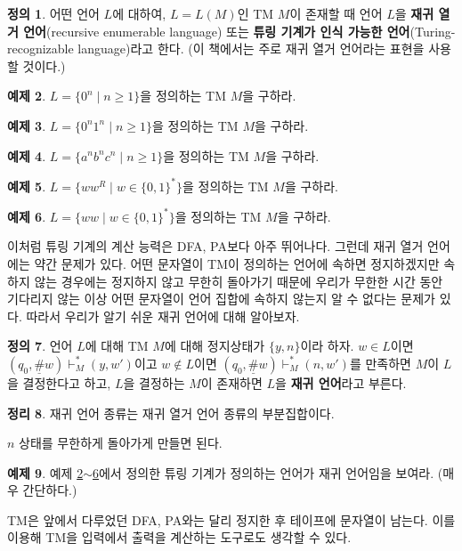\documentclass[b5paper, 11pt]{book}
\theoremstyle{definition}
\newtheorem{defn}{정의}[chapter]
\newtheorem{thm}[defn]{정리}
\newtheorem{ex}[defn]{예제}
\newenvironment{pf*}{\pushQED{\qed}\pf}
{\popQED\endpf}
\begin{document}
\begin{defn}
    어떤 언어 $L$에 대하여, $L = L(M)$인 TM $M$이 존재할 때 언어 $L$을 \textbf{재귀 열거 언어}(recursive enumerable language) 또는 \textbf{튜링 기계가 인식 가능한 언어}(Turing-recognizable language)라고 한다. (이 책에서는 주로 재귀 열거 언어라는 표현을 사용할 것이다.)
\end{defn}
\begin{ex}\label{tm ex1} 
    $L = \{0^n \;\vert\; n \ge 1\}$을 정의하는 TM $M$을 구하라.
\end{ex}
\begin{ex}
    $L = \{0^n1^n \;\vert\; n \ge 1\}$을 정의하는 TM $M$을 구하라.
\end{ex}
\begin{ex}
    $L = \{a^n b^n c^n \;\vert\; n \ge 1\}$을 정의하는 TM $M$을 구하라.
\end{ex}
\begin{ex}
    $L = \{w w^R \;\vert\; w \in \{0,1\}^*\}$을 정의하는 TM $M$을 구하라.
\end{ex}
\begin{ex}
    \label{tm ex4}
    $L = \{ww \;\vert\; w \in \{0,1\}^*\}$을 정의하는 TM $M$을 구하라.
\end{ex}
이처럼 튜링 기계의 계산 능력은 DFA, PA보다 아주 뛰어나다. 그런데 재귀 열거 언어에는 약간 문제가 있다. 어떤 문자열이 TM이 정의하는 언어에 속하면 정지하겠지만 속하지 않는 경우에는 정지하지 않고 무한히 돌아가기 때문에 우리가 무한한 시간 동안 기다리지 않는 이상 어떤 문자열이 언어 집합에 속하지 않는지 알 수 없다는 문제가 있다. 따라서 우리가 알기 쉬운 재귀 언어에 대해 알아보자.
\begin{defn}
    언어 $L$에 대해 TM $M$에 대해 정지상태가 $\{y,n\}$이라 하자. $w \in L$이면 $(q_0, \underline{\#}w) \vdash_M^* (y, w')$이고 $w \notin L$이면 $(q_0, \underline{\#}w) \vdash_M^* (n, w')$를 만족하면 $M$이 $L$을 결정한다고 하고, $L$을 결정하는 $M$이 존재하면 $L$을 \textbf{재귀 언어}라고 부른다.
\end{defn}
\begin{thm}
    재귀 언어 종류는 재귀 열거 언어 종류의 부분집합이다.
\end{thm}
\begin{pf*}
    $n$ 상태를 무한하게 돌아가게 만들면 된다.
\end{pf*}
\begin{ex}
    예제 \ref{tm ex1}$\sim$\ref{tm ex4}에서 정의한 튜링 기계가 정의하는 언어가 재귀 언어임을 보여라. (매우 간단하다.)
\end{ex}
TM은 앞에서 다루었던 DFA, PA와는 달리 정지한 후 테이프에 문자열이 남는다. 이를 이용해 TM을 입력에서 출력을 계산하는 도구로도 생각할 수 있다.
\end{document}
